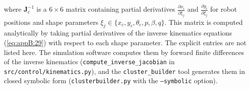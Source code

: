 where $\mathbf{J}_c^{-1}$ is a $6 \times 6$ matrix containing partial derivatives $\frac{\partial x_i}{\partial \xi_j}$ and $\frac{\partial y_i}{\partial \xi_j}$ for robot positions and shape parameters $\xi_j \in \{x_c, y_c, \theta_c, p, \beta, q\}$. This matrix is computed analytically by taking partial derivatives of the inverse kinematics equations (\ref{eq:appB:29}) with respect to each shape parameter. The explicit entries are not listed here. The simulation software computes them by forward finite differences of the inverse kinematics (\texttt{compute\_inverse\_jacobian} in \texttt{src/control/kinematics.py}), and the \texttt{cluster\_builder} tool generates them in closed symbolic form (\texttt{clusterbuilder.py} with the \texttt{--symbolic} option).
